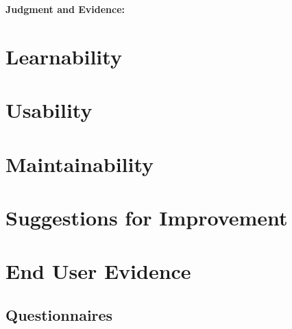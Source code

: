 {\textbf{Judgment and Evidence:} \newline









\section{Learnability}

\section{Usability}

\section{Maintainability}

\section{Suggestions for Improvement}

\section{End User Evidence}

\pagebreak
\subsection{Questionnaires}






















}
